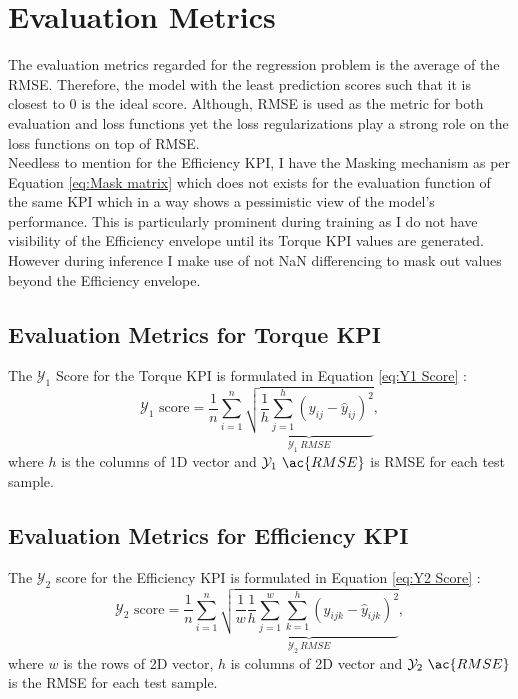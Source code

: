 \documentclass{report} %
\begin{document}
\section{Evaluation Metrics}
The evaluation metrics regarded for the regression problem is the average of the \ac{RMSE}. 
Therefore, the model with the least prediction scores such that it is closest to 0 is the ideal score. 
Although, \ac{RMSE} is used as the metric for both evaluation and loss functions yet the loss regularizations play a strong role on the loss functions on top of \ac{RMSE}.\\
Needless to mention for the Efficiency \ac{KPI}, I have the Masking mechanism as per Equation \ref{eq:Mask matrix} which does not exists for the evaluation function of the 
same \ac{KPI} which in a way shows a pessimistic view of the model's performance. This is particularly prominent during training as I do not have visibility of the 
Efficiency envelope until its Torque \ac{KPI} values are generated. However during inference I make use of not \ac{NaN} differencing to mask out values beyond the Efficiency envelope. 

\subsection{Evaluation Metrics for Torque KPI}\label{subsec:Evaluation Metrics for 2D KPI}
The $\mathcal{Y}_1$ Score for the Torque \ac{KPI} is formulated in Equation \ref{eq:Y1 Score} :
\begin{equation}
\text{$\mathcal{Y}_1$ score} = \frac{1}{n} \sum_{i=1}^{n} \underbrace{ \sqrt{\frac{1}{h} \sum_{j=1}^{h} (y_{ij} - \hat{y}_{ij})^2}}_{\mathcal{Y}_1\ RMSE},
\label{eq:Y1 Score}
\end{equation}
where \(h\) is the columns of 1D vector and \(\mathcal{Y}_1\ \ac{RMSE}\) is \ac{RMSE} for each test sample.

\subsection{Evaluation Metrics for Efficiency KPI}\label{subsec:Evaluation Metrics for 3D KPI}
The $\mathcal{Y}_2$ score for the Efficiency \ac{KPI} is formulated in Equation \ref{eq:Y2 Score} :
\begin{equation}
    \text{$\mathcal{Y}_2$ score} = \frac{1}{n} \sum_{i=1}^{n} \underbrace{ \sqrt{\frac{1}{w} \frac{1}{h} \sum_{j=1}^{w} \sum_{k=1}^{h} (y_{ijk} - \hat{y}_{ijk})^2}}_{\mathcal{Y}_2\ RMSE},
    \label{eq:Y2 Score}
\end{equation}
where \(w\) is the rows of 2\ac{D} vector, \(h\) is columns of 2\ac{D} vector and \(\mathcal{Y}_2\ \ac{RMSE}\) is the \ac{RMSE} for each test sample.\\
\end{document}
